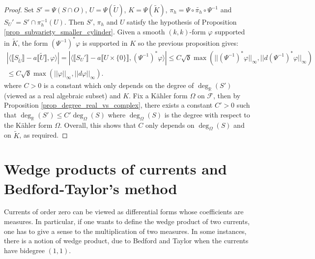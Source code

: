\documentclass[12pt]{amsbook}%
\theoremstyle{definition}
\theoremstyle{remark}
\numberwithin{section}{chapter}
\numberwithin{subsection}{section}
\numberwithin{figure}{chapter}
\DeclareMathOperator{\R}{\mathbb{R}}
\newcommand\intcur[1]{\llbracket #1 \rrbracket}
\def\cF{{\mathscr{F}}}
\def\fd{{\mathfrak{d}}}
\begin{document}
{{\begin{proof}
Set $S' =\Psi(S\cap O)$, $U = \Psi(\tilde{U})$, $K = \Psi(\tilde{K})$, $\pi_h =\Psi \circ  \tilde{\pi_h} \circ \Psi^{-1}$ and  $S_U' = S' \cap \pi_h^{-1}(U) $. 
Then $S' $, $\pi_h$ and $U$ satisfy the hypothesis of Proposition \ref{prop_subvariety_smaller_cylinder}. 
 Given a smooth  $(k,k)$-form $\varphi$ supported in $\tilde{K}$, the form $(\Psi^{-1})^* \varphi $ is supported in $K$ so the previous proposition gives: 
 \begin{multline*}
 | \langle \intcur{S_{\tilde{U}}} - a \intcur{\tilde{U}} ,\varphi \rangle| = | \langle \intcur{S_{U}'}  - a \intcur{U \times \{0 \}} , (\Psi^{-1})^* \varphi \rangle| \leqslant C \sqrt{\fd} \max (||(\Psi^{-1})^* \varphi||_\infty , ||d(\Psi^{-1})^* \varphi||_\infty) \\
 \leqslant C \sqrt{\fd} \max(||\varphi||_\infty, || d\varphi||_{\infty}). 
 \end{multline*}
 where $C>0$ is a constant which only depends on the degree of $\deg_{\R}(S')$ (viewed as a real algebraic subset) and $K$. 
 Fix a K\"ahler form $\Omega$ on $\cF$, then by Proposition \ref{prop_degree_real_vs_complex}, there exists a constant $C'>0$ such that $\deg_{\R}(S') \leqslant C' \deg_{\Omega}(S)$ where $\deg_{\Omega}(S)$ is the degree with respect to the K\"ahler form $\Omega$.  
 Overall, this shows that $C$ only depends on $\deg_{\Omega}(S)$ and on $\tilde{K}$, as required.
\end{proof}

\section{Wedge products of currents and Bedford-Taylor's method}
\label{section_bedford}

Currents of order zero can be viewed as differential forms whose coefficients are measures. In particular, if one wants to define the  wedge product of two currents, one has to give a sense to the multiplication of two measures. 
In some instances, there is a notion of wedge product, due to Bedford and Taylor when the currents have bidegree $(1,1)$. 


}}
\end{document}
